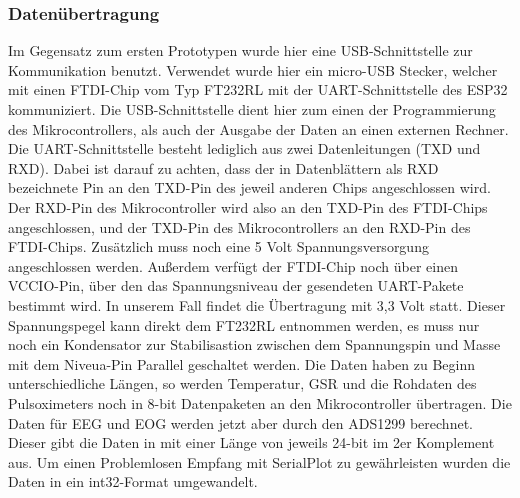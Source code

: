\subsubsection{Daten{\"u}bertragung} \label{datenuebertragung-subsubsec}

Im Gegensatz zum ersten Prototypen wurde hier eine USB-Schnittstelle zur Kommunikation benutzt. Verwendet wurde hier ein micro-USB Stecker, welcher mit einen FTDI-Chip vom Typ FT232RL mit der UART-Schnittstelle des ESP32 kommuniziert. Die USB-Schnittstelle dient hier zum einen der Programmierung des Mikrocontrollers, als auch der Ausgabe der Daten an einen externen Rechner. Die UART-Schnittstelle besteht lediglich aus zwei Datenleitungen (TXD und RXD). Dabei ist darauf zu achten, dass der in Datenblättern als RXD bezeichnete Pin an den TXD-Pin des jeweil anderen Chips angeschlossen wird. Der RXD-Pin des Mikrocontroller wird also an den TXD-Pin des FTDI-Chips angeschlossen, und der TXD-Pin des Mikrocontrollers an den RXD-Pin des FTDI-Chips. Zusätzlich muss noch eine 5 Volt Spannungsversorgung angeschlossen werden. Außerdem verfügt der FTDI-Chip noch über einen VCCIO-Pin, über den das Spannungsniveau der gesendeten UART-Pakete bestimmt wird. In unserem Fall findet die Übertragung mit 3,3 Volt statt. Dieser Spannungspegel kann direkt dem FT232RL entnommen werden, es muss nur noch ein Kondensator zur Stabilisastion zwischen dem Spannungspin und Masse mit dem Niveua-Pin Parallel geschaltet werden. 
Die Daten haben zu Beginn unterschiedliche Längen, so werden Temperatur, GSR und die Rohdaten des Pulsoximeters noch in 8-bit Datenpaketen an den Mikrocontroller übertragen. Die Daten für EEG und EOG werden jetzt aber durch den ADS1299 berechnet. Dieser gibt die Daten in mit einer Länge von jeweils 24-bit im 2er Komplement aus. Um einen Problemlosen Empfang mit SerialPlot zu gewährleisten wurden  die Daten in ein int32-Format umgewandelt. 





